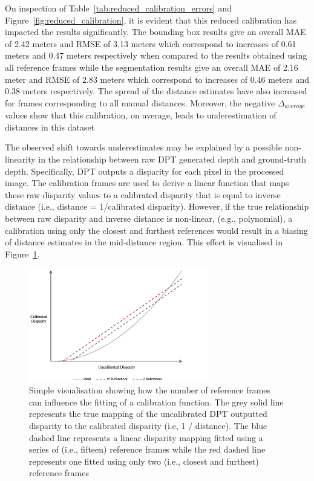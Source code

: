 On inspection of Table~\ref{tab:reduced_calibration_errors} and Figure~\ref{fig:reduced_calibration},
it is evident that this reduced calibration has impacted the results significantly.
The bounding box results give an overall MAE of 2.42 meters and RMSE of 3.13 meters which correspond
to increases of 0.61 meters and 0.47 meters respectively when compared to the results obtained using
all reference frames while the segmentation results give an overall MAE of 2.16 meter and RMSE of
2.83 meters which correspond to increases of 0.46 meters and 0.38 meters respectively.
The spread of the distance estimates have also increased for frames corresponding to all manual
distances.
Moreover, the negative $\Delta_{average}$ values show that this calibration, on average, leads to
underestimation of distances in this dataset

The observed shift towards underestimates may be explained by a possible non-linearity in the
relationship between raw DPT generated depth and ground-truth depth.
Specifically, DPT outputs a disparity for each pixel in the processed image.
The calibration frames are used to derive a linear function that maps these raw disparity
values to a calibrated disparity\cite{HAUCKE2022101536} that is equal to inverse distance
(i.e., distance = 1/calibrated disparity).
However, if the true relationship between raw disparity and inverse distance is non-linear,
(e.g., polynomial), a calibration using only the closest and furthest references would result
in a biasing of distance estimates in the mid-distance region.
This effect is visualised in Figure~\ref{fig:disparity_calibration}.

\begin{figure}[H]
    \centering
    \includegraphics[width=0.7\textwidth]{body/analysis/assets/calibration_effects/disparity_calibration}
    \caption{Simple visualisation showing how the number of reference frames can influence the fitting
        of a calibration function. The grey solid line represents the true mapping of the uncalibrated DPT
        outputted disparity to the calibrated disparity (i.e, 1 / distance). The blue dashed line represents
        a linear disparity mapping fitted using a series of (i.e., fifteen) reference frames while the red
        dashed line represents one fitted using only two (i.e., closest and furthest) reference frames}
    \label{fig:disparity_calibration}
\end{figure}

